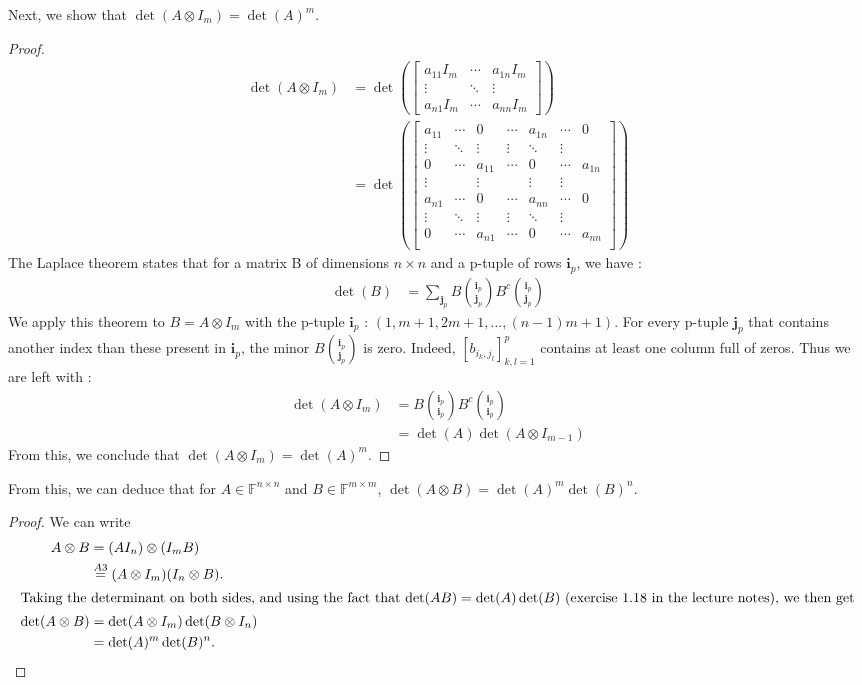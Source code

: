 \documentclass[11pt]{article}
\newcommand{\field}{\mathbb{F}} %
\newcommand{\kp}{\otimes} %
\begin{document}
Next, we show that \(\det(A \kp I_m) = \det(A)^m\).
\begin{proof}
\begin{align*}
\det(A \kp I_m) &= \det \left(\begin{bmatrix}
a_{11} I_m & \cdots & a_{1n} I_m \\
\vdots & \ddots & \vdots \\
a_{n1} I_m & \cdots & a_{nn} I_m
\end{bmatrix}\right)\\
&=\det \left(\begin{bmatrix}
a_{11} & \cdots & 0 & \cdots & a_{1n} & \cdots & 0\\
\vdots & \ddots & \vdots & \vdots & \ddots & \vdots \\
0 & \cdots & a_{11} & \cdots & 0 & \cdots & a_{1n}\\
\vdots &  & \vdots &  & \vdots & \vdots \\
a_{n1} & \cdots & 0 & \cdots & a_{nn} & \cdots & 0\\
\vdots & \ddots & \vdots & \vdots & \ddots & \vdots \\
0 & \cdots & a_{n1} & \cdots & 0 & \cdots & a_{nn}\\
\end{bmatrix}\right)
\end{align*}
The Laplace theorem states that for a matrix B of dimensions \(n\times n\) and a p-tuple of rows $\bm{i}_p$, we have :
\begin{align*}
\det(B) &= \sum_{\bm{j}_p} B {\bm{i}_p\choose \bm{j}_p} B^c {\bm{i}_p\choose \bm{j}_p}
\end{align*}
We apply this theorem to $B=A \kp I_m$ with the p-tuple $\bm{i}_p$ : $(1,m+1,2m+1,...,(n-1)m+1)$. For every p-tuple $\bm{j}_p$ that contains another index than these present in $\bm{i}_p$, the minor $B {\bm{i}_p\choose \bm{j}_p}$ is zero. Indeed, $[b_{i_k,j_l}]_{k,l=1}^{p}$ contains at least one column full of zeros. Thus we are left with :
\begin{align*}
\det(A \kp I_m) &= B {\bm{i}_p\choose \bm{i}_p} B^c {\bm{i}_p\choose \bm{i}_p}\\
&= \det(A) \det(A \kp I_{m-1})
\end{align*}
From this, we conclude that \(\det(A \kp I_m) = \det(A)^m\).
\end{proof}

From this, we can deduce that for \(A \in \field^{n \times n}\) and \(B \in \field^{m \times m}\), \(\det(A \kp B) = \det(A)^m \det(B)^n\).
\begin{proof}
We can write
\begin{align*}
A \kp B &= (A I_n) \kp (I_m B)\\
&\overset{A3}{=} (A \kp I_m) (I_n \kp B).\\
\intertext{Taking the determinant on both sides, and using the fact that 
\(\det(AB) = \det(A)\det(B)\) (exercise 1.18 in the lecture notes), we then get}
\det(A \kp B) &= \det(A \kp I_m) \det(B \kp I_n)\\
&= \det(A)^m \det(B)^n.\qedhere
\end{align*}
\end{proof}
\end{document}
